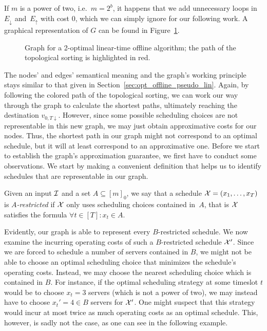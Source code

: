 If $m$ is a power of two, i.e.\ $m=2^b$, it happens that we add unnecessary loops in~$E_\downarrow$ and~$E_\uparrow$ with cost $0$, which we can simply ignore for our following work.
A graphical representation of $G$ can be found in Figure~\ref{fig:graph_lin_approx_2}.
\begin{figure}[H]

\caption{Graph for a 2-optimal linear-time offline algorithm; the path of the topological sorting is highlighted in red.}
\label{fig:graph_lin_approx_2}
\end{figure}
The nodes' and edges' semantical meaning and the graph's working principle stays similar to that given in Section~\ref{sec:opt_offline_pseudo_lin}. Again, by following the colored path of the topological sorting, we can work our way through the graph to calculate the shortest paths, ultimately reaching the destination $v_{0,T\downarrow}$. However, since some possible scheduling choices are not representable in this new graph, we may just obtain approximative costs for our nodes. Thus, the shortest path in our graph might not correspond to an optimal schedule, but it will at least correspond to an approximative one. Before we start to establish the graph's approximation guarantee, we first have to conduct some observations. We start by making a convenient definition that helps us to identify schedules that are representable in our graph.
\begin{defn}
Given an input $\mathcal{I}$ and a set $A\subseteq[m]_0$, we say that a schedule $\mathcal{X}=(x_1,\dotsc,x_T)$ is \emph{$A$-restricted} if $\mathcal{X}$ only uses scheduling choices contained in~$A$, that is $\mathcal{X}$ satisfies the formula $\forall t\in[T]:x_t\in A$.
\end{defn}
Evidently, our graph is able to represent every $B$-restricted schedule. We now examine the incurring operating costs of such a $B$-restricted schedule $\mathcal{X}'$. Since we are forced to schedule a number of servers contained in $B$, we might not be able to choose an optimal scheduling choice that minimizes the schedule's operating costs. Instead, we may choose the nearest scheduling choice which is contained in $B$. For instance, if the optimal scheduling strategy at some timeslot $t$ would be to choose $x_t=3$ servers (which is not a power of two), we may instead have to choose $x_t'=4\in B$ servers for $\mathcal{X}'$. One might suspect that this strategy would incur at most twice as much operating costs as an optimal schedule. This, however, is sadly not the case, as one can see in the following example.
